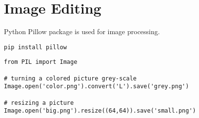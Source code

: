 \section{Image Editing}

Python Pillow package is used for image processing.

\begin{verbatim}
pip install pillow
\end{verbatim}

\begin{lstlisting}
from PIL import Image

# turning a colored picture grey-scale
Image.open('color.png').convert('L').save('grey.png')

# resizing a picture
Image.open('big.png').resize((64,64)).save('small.png')
\end{lstlisting}


